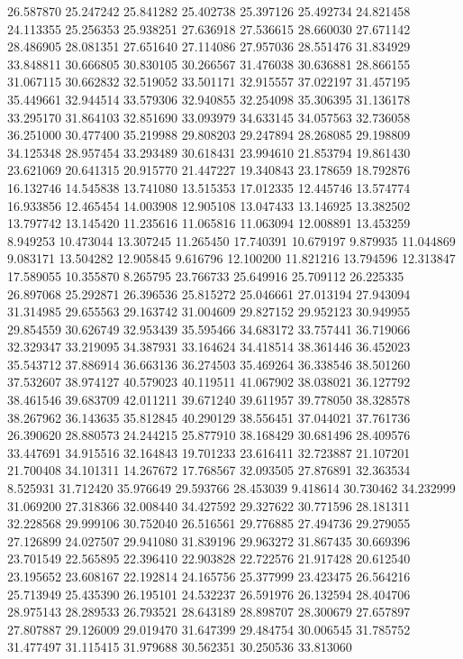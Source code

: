26.587870
25.247242
25.841282
25.402738
25.397126
25.492734
24.821458
24.113355
25.256353
25.938251
27.636918
27.536615
28.660030
27.671142
28.486905
28.081351
27.651640
27.114086
27.957036
28.551476
31.834929
33.848811
30.666805
30.830105
30.266567
31.476038
30.636881
28.866155
31.067115
30.662832
32.519052
33.501171
32.915557
37.022197
31.457195
35.449661
32.944514
33.579306
32.940855
32.254098
35.306395
31.136178
33.295170
31.864103
32.851690
33.093979
34.633145
34.057563
32.736058
36.251000
30.477400
35.219988
29.808203
29.247894
28.268085
29.198809
34.125348
28.957454
33.293489
30.618431
23.994610
21.853794
19.861430
23.621069
20.641315
20.915770
21.447227
19.340843
23.178659
18.792876
16.132746
14.545838
13.741080
13.515353
17.012335
12.445746
13.574774
16.933856
12.465454
14.003908
12.905108
13.047433
13.146925
13.382502
13.797742
13.145420
11.235616
11.065816
11.063094
12.008891
13.453259
8.949253
10.473044
13.307245
11.265450
17.740391
10.679197
9.879935
11.044869
9.083171
13.504282
12.905845
9.616796
12.100200
11.821216
13.794596
12.313847
17.589055
10.355870
8.265795
23.766733
25.649916
25.709112
26.225335
26.897068
25.292871
26.396536
25.815272
25.046661
27.013194
27.943094
31.314985
29.655563
29.163742
31.004609
29.827152
29.952123
30.949955
29.854559
30.626749
32.953439
35.595466
34.683172
33.757441
36.719066
32.329347
33.219095
34.387931
33.164624
34.418514
38.361446
36.452023
35.543712
37.886914
36.663136
36.274503
35.469264
36.338546
38.501260
37.532607
38.974127
40.579023
40.119511
41.067902
38.038021
36.127792
38.461546
39.683709
42.011211
39.671240
39.611957
39.778050
38.328578
38.267962
36.143635
35.812845
40.290129
38.556451
37.044021
37.761736
26.390620
28.880573
24.244215
25.877910
38.168429
30.681496
28.409576
33.447691
34.915516
32.164843
19.701233
23.616411
32.723887
21.107201
21.700408
34.101311
14.267672
17.768567
32.093505
27.876891
32.363534
8.525931
31.712420
35.976649
29.593766
28.453039
9.418614
30.730462
34.232999
31.069200
27.318366
32.008440
34.427592
29.327622
30.771596
28.181311
32.228568
29.999106
30.752040
26.516561
29.776885
27.494736
29.279055
27.126899
24.027507
29.941080
31.839196
29.963272
31.867435
30.669396
23.701549
22.565895
22.396410
22.903828
22.722576
21.917428
20.612540
23.195652
23.608167
22.192814
24.165756
25.377999
23.423475
26.564216
25.713949
25.435390
26.195101
24.532237
26.591976
26.132594
28.404706
28.975143
28.289533
26.793521
28.643189
28.898707
28.300679
27.657897
27.807887
29.126009
29.019470
31.647399
29.484754
30.006545
31.785752
31.477497
31.115415
31.979688
30.562351
30.250536
33.813060
